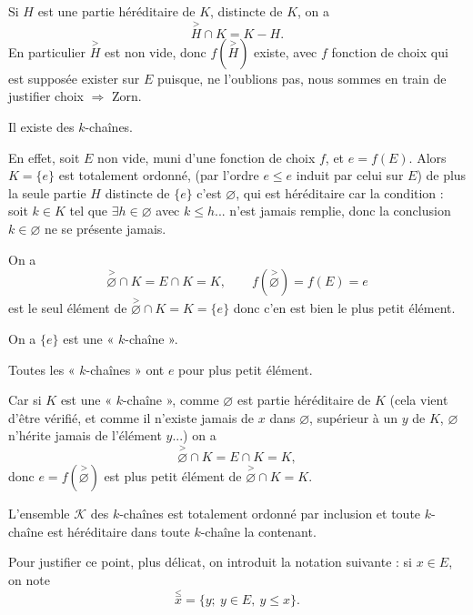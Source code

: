 \begin{description}[leftmargin=7.2em,labelwidth=6.4em,labelsep=.6em,font=\itshape]
\item[1\textsuperscript{er} point :] Si $H$ est une partie héréditaire de $K$, distincte de $K$, on a
\[
\overset{>}{H}\cap K=K-H.
\]
En particulier $\overset{>}{H}$ est non vide, donc $f(\overset{>}{H})$ existe, avec $f$ fonction de choix qui est supposée exister sur $E$ puisque, ne l'oublions pas, nous sommes en train de justifier choix $\Rightarrow$ Zorn.

\item[2\textsuperscript{e} point :] Il existe des $k$-chaînes.

En effet, soit $E$ non vide, muni d'une fonction de choix $f$, et $e=f(E)$. Alors $K=\{e\}$ est totalement ordonné, (par l'ordre $e\le e$ induit par celui sur $E$) de plus la seule partie $H$ distincte de $\{e\}$ c'est $\varnothing$, qui est héréditaire car la condition : soit $k\in K$ tel que $\exists h\in\varnothing$ avec $k\le h$... n'est jamais remplie, donc la conclusion $k\in\varnothing$ ne se présente jamais.

On a
\[
\overset{>}{\varnothing}\cap K=E\cap K=K,
\qquad
f(\overset{>}{\varnothing})=f(E)=e
\]
est le seul élément de $\overset{>}{\varnothing}\cap K=K=\{e\}$ donc c'en est bien le plus petit élément.

On a $\{e\}$ est une « $k$-chaîne ».

\item[3\textsuperscript{e} point :] Toutes les « $k$-chaînes » ont $e$ pour plus petit élément.

Car si $K$ est une « $k$-chaîne », comme $\varnothing$ est partie héréditaire de $K$ (cela vient d'être vérifié, et comme il n'existe jamais de $x$ dans $\varnothing$, supérieur à un $y$ de $K$, $\varnothing$ n'hérite jamais de l'élément $y$...) on a
\[
\overset{>}{\varnothing}\cap K=E\cap K=K,
\]
donc $e=f(\overset{>}{\varnothing})$ est plus petit élément de $\overset{>}{\varnothing}\cap K=K$.

\item[4\textsuperscript{e} point :] L'ensemble $\mathcal K$ des $k$-chaînes est totalement ordonné par inclusion et toute $k$-chaîne est héréditaire dans toute $k$-chaîne la contenant.
\end{description}

Pour justifier ce point, plus délicat, on introduit la notation suivante : si $x\in E$, on note
\[
\overset{\le}{x}=\{y;\ y\in E,\ y\le x\}.
\]

